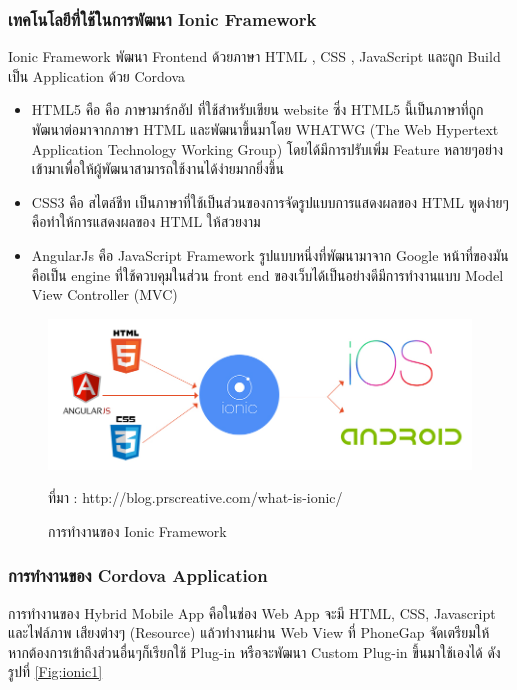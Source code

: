 		\subsubsection{เทคโนโลยีที่ใช้ในการพัฒนา Ionic Framework} 
		Ionic Framework พัฒนา Frontend ด้วยภาษา HTML , CSS , JavaScript และถูก Build เป็น Application ด้วย Cordova
		\begin{itemize}
		\item HTML5  คือ คือ ภาษามาร์กอัป ที่ใช้สำหรับเขียน website ซึ่ง HTML5 นี้เป็นภาษาที่ถูกพัฒนาต่อมาจากภาษา HTML และพัฒนาขึ้นมาโดย WHATWG (The Web Hypertext Application Technology Working Group) โดยได้มีการปรับเพิ่ม Feature หลายๆอย่างเข้ามาเพื่อให้ผู้พัฒนาสามารถใช้งานได้ง่ายมากยิ่งขึ้น
		\item CSS3  คือ สไตล์ชีท เป็นภาษาที่ใช้เป็นส่วนของการจัดรูปแบบการแสดงผลของ HTML พูดง่ายๆ คือทำให้การแสดงผลของ HTML ให้สวยงาม
		\item AngularJs คือ JavaScript Framework  รูปแบบหนึ่งที่พัฒนามาจาก Google หน้าที่ของมันคือเป็น engine ที่ใช้ควบคุมในส่วน front end ของเว็บได้เป็นอย่างดีมีการทำงานแบบ Model View Controller (MVC)
		\end{itemize}
		\begin{figure}[H]
			\centering
			\includegraphics[width=0.8\columnwidth]{Figures/2/ionic1}
			\caption{การทำงานของ Ionic Framework}{ที่มา : http://blog.prscreative.com/what-is-ionic/}
			\label{Fig:ionic}
		\end{figure}

		\subsubsection{การทำงานของ Cordova Application}
		การทำงานของ Hybrid Mobile App คือในช่อง Web App จะมี HTML, CSS, Javascript และไฟล์ภาพ เสียงต่างๆ (Resource) แล้วทำงานผ่าน Web View ที่ PhoneGap จัดเตรียมให้ หากต้องการเข้าถึงส่วนอื่นๆก็เรียกใช้ Plug-in หรือจะพัฒนา Custom Plug-in ขึ้นมาใช้เองได้ ดังรูปที่ \ref{Fig:ionic1}
		
